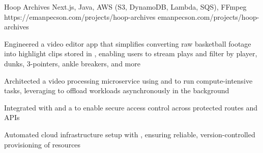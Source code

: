 
\projheader
{Hoop Archives}
{Next.js, Java, AWS (S3, DynamoDB, Lambda, SQS), FFmpeg}
{https://emanpecson.com/projects/hoop-archives}
{emanpecson.com/projects/hoop-archives}

\begin{bullets}
	\item Engineered a video editor app that simplifies converting raw basketball footage into highlight clips stored in , enabling users to stream plays and filter by player, dunks, 3-pointers, ankle breakers, and more

	\item Architected a video processing microservice using  and  to run compute-intensive  tasks, leveraging  to offload workloads asynchronously in the background

	\item Integrated  with  and a  to enable secure access control across protected routes and APIs
	
	\item Automated cloud infrastructure setup with , ensuring reliable, version-controlled provisioning of resources
\end{bullets}
